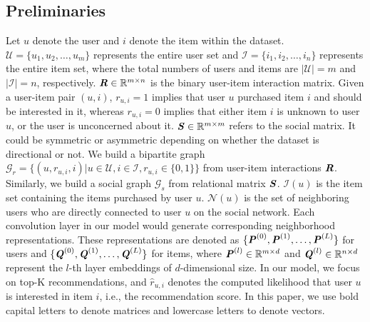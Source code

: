 \documentclass[letterpaper]{article} %
\begin{document}
\subsection{Preliminaries}
Let $u$ denote the user and $i$ denote the item within the dataset. $\mathcal{U}=\{u_1,  u_2, \ldots, u_m\}$ represents the entire user set and $\mathcal{I}=\{i_1, i_2, \ldots, i_n\}$ represents the entire item set, where the total numbers of users and items are $|\mathcal{U}|=m$ and $|\mathcal{I}|=n$, respectively. $\textbf{\textit{R}} \in \mathbb{R}^{m\times n}$ is the binary user-item interaction matrix. Given a user-item pair $(u, i)$, $r_{u,i}=1$ implies that user $u$ purchased item $i$ and should be interested in it, whereas $r_{u,i}=0$ implies that either item $i$ is unknown to user $u$, or the user is unconcerned about it. $\textbf{\textit{S}} \in \mathbb{R}^{m\times m}$ refers to the social matrix. It could be symmetric or asymmetric depending on whether the dataset is directional or not. We build a bipartite graph $\mathcal{G}_r=\{(u, r_{u,i}, i)|u\in \mathcal{U}, i\in \mathcal{I}, r_{u,i}\in \{0,1\}\}$ from user-item interactions $\textbf{\textit{R}}$. Similarly, we build a social graph $\mathcal{G}_s$ from relational matrix $\textbf{\textit{S}}$. $\mathcal{I}(u)$ is the item set containing the items purchased by user $u$. $\mathcal{N}(u)$ is the set of neighboring users who are directly connected to user $u$ on the social network. Each convolution layer in our model would generate corresponding neighborhood representations. These representations are denoted as $\{\textbf{\textit{P}}^{(0)}, \textbf{\textit{P}}^{(1)}, \ldots, \textbf{\textit{P}}^{(L)}\}$ for users and $\{\textbf{\textit{Q}}^{(0)}, \textbf{\textit{Q}}^{(1)}, \ldots, \textbf{\textit{Q}}^{(L)}\}$ for items, where $\textbf{\textit{P}}^{(l)} \in \mathbb{R}^{m\times d}$ and $\textbf{\textit{Q}}^{(l)} \in \mathbb{R}^{n\times d}$ represent the $l$-th layer embeddings of $d$-dimensional size. In our model, we focus on top-K recommendations, and $\hat{r}_{u, i}$ denotes the computed likelihood that user $u$ is interested in item $i$, i.e., the recommendation score. In this paper, we use bold capital letters to denote matrices and lowercase letters to denote vectors.
\end{document}
